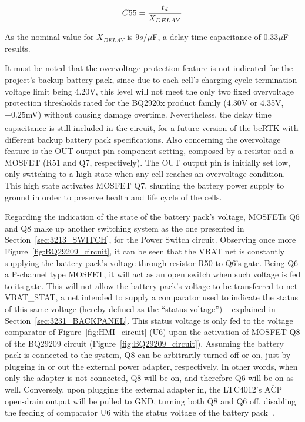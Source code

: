 \begin{equation}\label{eq:CCD}
	C55=\frac{t_d}{X_{DELAY}}\,\medskip
\end{equation}

\noindent As the nominal value for $X_{DELAY}$ is $9s/ \mu$F, a delay time capacitance of $0.33 \mu$F results.

It must be noted that the overvoltage protection feature is not indicated for the project's backup battery pack, since due to each cell's charging cycle termination voltage limit being 4.20V, this level will not meet the only two fixed overvoltage protection thresholds rated for the BQ2920x product family (4.30V or 4.35V, $\pm 0.25$mV) without causing damage overtime. Nevertheless, the delay time capacitance is still included in the circuit, for a future version of the beRTK\textsuperscript{\textregistered} with different backup battery pack specifications. Also concerning the overvoltage feature is the OUT output pin component setting, composed by a resistor and a MOSFET (R51 and Q7, respectively). The OUT output pin is initially set low, only switching to a high state when any cell reaches an overvoltage condition. This high state activates MOSFET Q7, shunting the battery power supply to ground in order to preserve health and life cycle of the cells.

Regarding the indication of the state of the battery pack's voltage, MOSFETs Q6 and Q8 make up another switching system as the one presented in Section~\ref{sec:3213_SWITCH}, for the Power Switch circuit. Observing once more Figure~\ref{fig:BQ29209_circuit}, it can be seen that the VBAT net is constantly supplying the battery pack's voltage through resistor R50 to Q6's gate. Being Q6 a P-channel type MOSFET, it will act as an open switch when such voltage is fed to its gate. This will not allow the battery pack's voltage to be transferred to net VBAT\_STAT, a net intended to supply a comparator used to indicate the status of this same voltage (hereby defined as the ``status voltage'') -- explained in Section~\ref{sec:3231_BACKPANEL}. This status voltage is only fed to the voltage comparator of Figure~\ref{fig:HMI_circuit} (U6) upon the activation of MOSFET Q8 of the BQ29209 circuit (Figure~\ref{fig:BQ29209_circuit}). Assuming the battery pack is connected to the system, Q8 can be arbitrarily turned off or on, just by plugging in or out the external power adapter, respectively. In other words, when only the adapter is not connected, Q8 will be on, and therefore Q6 will be on as well. Conversely, upon plugging the external adapter in, the LTC4012's $\overline{\mbox{ACP}}$ open-drain output will be pulled to GND, turning both Q8 and Q6 off, disabling the feeding of comparator U6 with the status voltage of the battery pack~\cite{bq29209}.

